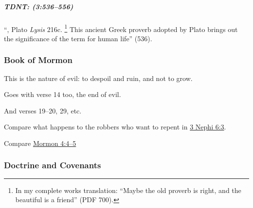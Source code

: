 				
			\subparagraph{TDNT: \texorpdfstring{}{} (3:536--556)}
				\label{KALOS-TDNT}
				
				``, Plato \textit{Lysis} 216c.%
					\footnote{%
						In my complete works translation: ``Maybe the old proverb is right, and the beautiful is a friend'' (PDF 700).
						}
				This ancient Greek proverb adopted by Plato brings out the significance of the term  for human life'' (536).
		
	\subsubsection{Book of Mormon} %
		\label{GOODNESS-BOM}
	
		
		\begin{compactdesc}
			\item[{\hyperref[3NEPHI-4-5]{3 Nephi 4:5}}] \phantom{.}
				\begin{compactitem}
					\item This is the nature of evil: to despoil and ruin, and not to grow.
					\item Goes with verse 14 too, the end of evil.
					\item And verses 19--20, 29, etc.
					\item Compare what happens to the robbers who want to repent in \hyperref[3NEPHI-6-3]{3 Nephi 6:3}.
					\item Compare \hyperref[MORMON-4-4]{Mormon 4:4--5}
				\end{compactitem}
		\end{compactdesc}
		
	\subsubsection{Doctrine and Covenants} %
		\label{GOODNESS-DC}
	
